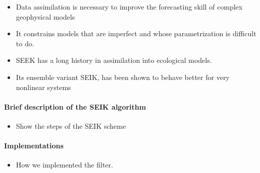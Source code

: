 \begin{itemize}
  \item Data assimilation is necessary to improve the forecasting skill of
complex geophysical models
  \item It constrains models that are imperfect and whose parametrization is
difficult to do.
  \item SEEK has a long history in assimilation into ecological models.
  \item Its ensemble variant SEIK, has been shown to behave better for very
nonlinear systems
\end{itemize}

\paragraph{Brief description of the SEIK algorithm}

\begin{itemize}
  \item Show the steps of the SEIK scheme
\end{itemize}

\paragraph{Implementations}

\begin{itemize}
  \item How we implemented the filter.
\end{itemize}
